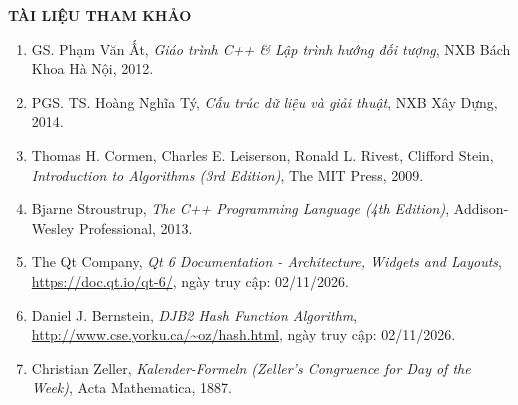 \documentclass[12pt,a4paper]{article}
\begin{document}
\newpage

\begin{center}
    \textbf{\Large TÀI LIỆU THAM KHẢO}
\end{center}
\vspace{0.5cm}

\begin{enumerate}
    \item[{[1]}] GS. Phạm Văn Ất, \textit{Giáo trình C++ \& Lập trình hướng đối tượng}, NXB Bách Khoa Hà Nội, 2012.
    \item[{[2]}] PGS. TS. Hoàng Nghĩa Tý, \textit{Cấu trúc dữ liệu và giải thuật}, NXB Xây Dựng, 2014.
    \item[{[3]}] Thomas H. Cormen, Charles E. Leiserson, Ronald L. Rivest, Clifford Stein, \textit{Introduction to Algorithms (3rd Edition)}, The MIT Press, 2009.
    \item[{[4]}] Bjarne Stroustrup, \textit{The C++ Programming Language (4th Edition)}, Addison-Wesley Professional, 2013.
    \item[{[5]}] The Qt Company, \textit{Qt 6 Documentation - Architecture, Widgets and Layouts}, \url{https://doc.qt.io/qt-6/}, ngày truy cập: 02/11/2026.
    \item[{[6]}] Daniel J. Bernstein, \textit{DJB2 Hash Function Algorithm}, \url{http://www.cse.yorku.ca/~oz/hash.html}, ngày truy cập: 02/11/2026.
    \item[{[7]}] Christian Zeller, \textit{Kalender-Formeln (Zeller's Congruence for Day of the Week)}, Acta Mathematica, 1887.
\end{enumerate}
\end{document}
